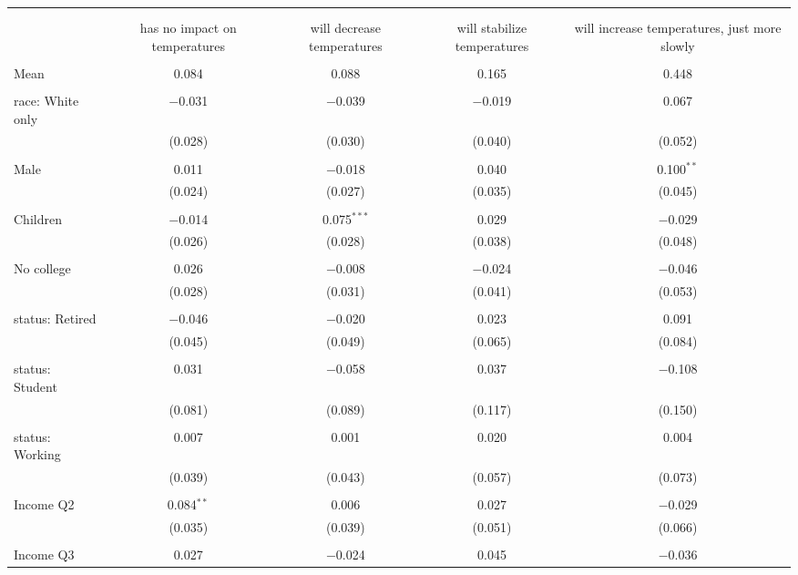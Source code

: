 
\begin{tabular}{@{\extracolsep{5pt}}lcccc} 
\\[-1.8ex]\hline 
\hline \\[-1.8ex] 
\\[-1.8ex] & has no impact on temperatures & will decrease temperatures & will stabilize temperatures & will increase temperatures, just more slowly \\ 
\hline \\[-1.8ex] 
 Mean & 0.084 & 0.088 & 0.165 & 0.448  \\ \hline \\[-1.8ex] race: White only & $-$0.031 & $-$0.039 & $-$0.019 & 0.067 \\ 
  & (0.028) & (0.030) & (0.040) & (0.052) \\ 
  & & & & \\ 
 Male & 0.011 & $-$0.018 & 0.040 & 0.100$^{**}$ \\ 
  & (0.024) & (0.027) & (0.035) & (0.045) \\ 
  & & & & \\ 
 Children & $-$0.014 & 0.075$^{***}$ & 0.029 & $-$0.029 \\ 
  & (0.026) & (0.028) & (0.038) & (0.048) \\ 
  & & & & \\ 
 No college & 0.026 & $-$0.008 & $-$0.024 & $-$0.046 \\ 
  & (0.028) & (0.031) & (0.041) & (0.053) \\ 
  & & & & \\ 
 status: Retired & $-$0.046 & $-$0.020 & 0.023 & 0.091 \\ 
  & (0.045) & (0.049) & (0.065) & (0.084) \\ 
  & & & & \\ 
 status: Student & 0.031 & $-$0.058 & 0.037 & $-$0.108 \\ 
  & (0.081) & (0.089) & (0.117) & (0.150) \\ 
  & & & & \\ 
 status: Working & 0.007 & 0.001 & 0.020 & 0.004 \\ 
  & (0.039) & (0.043) & (0.057) & (0.073) \\ 
  & & & & \\ 
 Income Q2 & 0.084$^{**}$ & 0.006 & 0.027 & $-$0.029 \\ 
  & (0.035) & (0.039) & (0.051) & (0.066) \\ 
  & & & & \\ 
 Income Q3 & 0.027 & $-$0.024 & 0.045 & $-$0.036 \\ 

\end{tabular}
